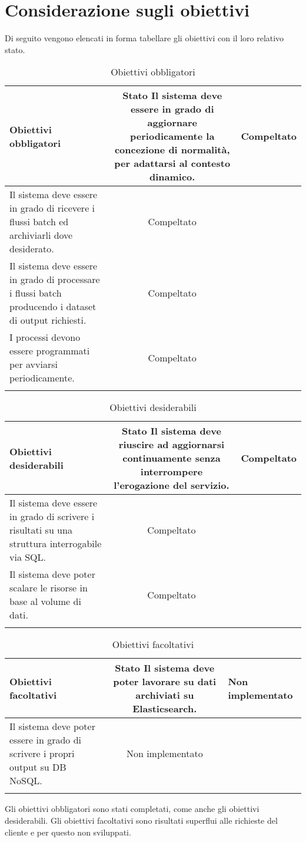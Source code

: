 \section{Considerazione sugli obiettivi}
Di seguito vengono elencati in forma tabellare gli obiettivi con il loro relativo stato.
\normalsize
\renewcommand{\arraystretch}{1.5}
\begin{longtable}{|K|c|}
	\hline
	\textbf{Obiettivi obbligatori} &
	\textbf{Stato} 
	\endhead
	\hline
	Il sistema deve essere in grado di aggiornare periodicamente la concezione di normalità, per adattarsi al contesto dinamico. & Compeltato  \\ \hline 	 
	Il sistema deve essere in grado di ricevere i flussi batch ed archiviarli dove desiderato. & Compeltato  \\ \hline 	 
	Il sistema deve essere in grado di processare i flussi batch producendo i dataset di output richiesti. & Compeltato  \\ \hline 	 
	I processi devono essere programmati per avviarsi periodicamente. & Compeltato  \\ \hline 	 
	\caption[Tabella degli obiettivi obbligatori]{Obiettivi obbligatori}
	\label{tabella:req3}
\end{longtable}
\renewcommand{\arraystretch}{1}
\normalsize
\renewcommand{\arraystretch}{1.5}
\begin{longtable}{|K|c|}
	\hline
	\textbf{Obiettivi desiderabili} &
	\textbf{Stato} 
	\endhead
	\hline
	Il sistema deve riuscire ad aggiornarsi continuamente senza interrompere l'erogazione del servizio. & Compeltato  \\ \hline 	 
	Il sistema deve essere in grado di scrivere i risultati su una struttura interrogabile via SQL. & Compeltato  \\ \hline 	 
	Il sistema deve poter scalare le risorse in base al volume di dati. & Compeltato  \\ \hline 	 
		\caption[Tabella degli obiettivi desiderabili]{Obiettivi desiderabili}
	\label{tabella:req3}
\end{longtable}
\renewcommand{\arraystretch}{1}
\normalsize
\renewcommand{\arraystretch}{1.5}
\begin{longtable}{|K|c|}
	\hline
	\textbf{Obiettivi facoltativi} &
	\textbf{Stato} 
	\endhead
	\hline
	Il sistema deve poter lavorare su dati archiviati su Elasticsearch. & Non implementato  \\ \hline 	 
	Il sistema deve poter essere in grado di scrivere i propri output su DB NoSQL. & Non implementato  \\ \hline 	 
	\caption[Tabella degli obiettivi facoltativi]{Obiettivi facoltativi}
	\label{tabella:req3}
\end{longtable}
\renewcommand{\arraystretch}{1}
Gli obiettivi obbligatori sono stati completati, come anche gli obiettivi desiderabili.
Gli obiettivi facoltativi sono risultati superflui alle richieste del cliente e per questo non sviluppati.

